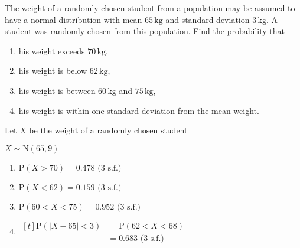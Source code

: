 \documentclass[11pt,a4paper]{book}
\begin{document}
\begin{example}

The weight of a randomly chosen student from a population may be assumed
to have a normal distribution with mean $65\,\text{kg}$ and standard
deviation $3\,\text{kg}$. A student was randomly chosen from this
population. Find the probability that

\begin{enumerate}[label=(\alph*)]

\item  his weight exceeds $\text{70}\,\text{kg}$,

\item  his weight is below $\text{62}\,\text{kg}$,

\item  his weight is between $60\,\text{kg}$ and $75\,\text{kg}$,

\item  his weight is within one standard deviation from the mean
weight.

\end{enumerate}

\Solution

Let $X$ be the weight of a randomly chosen student

$X\sim\text{N}\left(65,9\right)$

\begin{enumerate}[label=(\alph*)]

\item  $\text{P}\left(X>70\right)=0.478\text{ (3 s.f.)}$

\item  $\text{P}\left(X<62\right)=0.159\text{ (3 s.f.)}$

\item  $\text{P}\left(60<X<75\right)=0.952\text{ (3 s.f.)}$

\item
$
\begin{aligned}[t]
\text{P}\left(\left|X-65\right|<3\right) & =\text{P}\left(62<X<68\right)\\
 & =0.683\text{ (3 s.f.)}
\end{aligned}
$

\end{enumerate}

\end{example}
\end{document}
